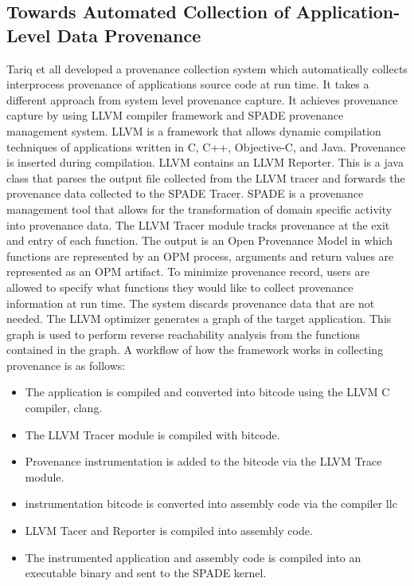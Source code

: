 \subsection{Towards Automated Collection of Application-Level Data Provenance}
Tariq et \cite{tariq_towards_2012} all developed a provenance collection system which automatically collects interprocess provenance of applications source code at run time. It takes a different approach from system level provenance capture. It achieves provenance capture by using LLVM compiler framework and SPADE provenance management system. LLVM is a framework that allows dynamic compilation techniques of applications written in C, C++, Objective-C, and Java. Provenance is inserted during compilation. LLVM contains an LLVM Reporter. This is a java class that parses the output file collected from the LLVM tracer and forwards the provenance data collected to the SPADE Tracer. SPADE is a provenance management tool that allows for the transformation of domain specific activity into provenance data. The LLVM Tracer module tracks provenance at the exit and entry of each function. The output is an Open Provenance Model in which functions are represented by an OPM process, arguments and return values are represented as an OPM artifact. To minimize provenance record, users are allowed to specify what functions they would like to collect provenance information at run time. The system discards provenance data that are not needed. The LLVM optimizer generates a graph of the target application. This graph is used to perform reverse reachability analysis  from the functions contained in the graph. A workflow of how the framework works in collecting provenance is as follows:

\begin{itemize}
\item The application is compiled and converted into bitcode using the LLVM C compiler, clang.

\item The LLVM Tracer module is compiled with bitcode.

\item Provenance instrumentation is added to the bitcode via the LLVM Trace module.

\item instrumentation bitcode is converted into assembly code via the compiler llc

\item LLVM Tacer and Reporter is compiled into assembly code.

\item  The instrumented application and assembly code is compiled into an executable binary and sent to the SPADE kernel.
\end{itemize}

